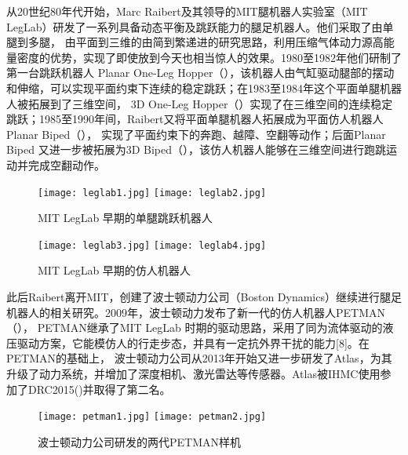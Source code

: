 从20世纪80年代开始，Marc Raibert及其领导的MIT腿机器人实验室（MIT LegLab）研发了一系列具备动态平衡及跳跃能力的腿足机器人。他们采取了由单腿到多腿，
由平面到三维的由简到繁递进的研究思路，利用压缩气体动力源高能量密度的优势，实现了即使放到今天也相当惊人的效果。1980至1982年他们研制了第一台跳跃机器人
Planar One-Leg Hopper（），该机器人由气缸驱动腿部的摆动和伸缩，可以实现平面约束下连续的稳定跳跃；在1983至1984年这个平面单腿机器人被拓展到了三维空间，
3D One-Leg Hopper（）实现了在三维空间的连续稳定跳跃；1985至1990年间，Raibert又将平面单腿机器人拓展成为平面仿人机器人Planar Biped（），
实现了平面约束下的奔跑、越障、空翻等动作；后面Planar Biped 又进一步被拓展为3D Biped（），该仿人机器人能够在三维空间进行跑跳运动并完成空翻动作\cite{raibert1986legged}。
\begin{figure}[htbp]
    \centering
        {%
            \texttt{[image: leglab1.jpg]}}
        {%
            \texttt{[image: leglab2.jpg]}}
    \caption{MIT LegLab 早期的单腿跳跃机器人\label{fig:leglab}}
\end{figure}
\begin{figure}[htbp]
    \centering
        {%
            \texttt{[image: leglab3.jpg]}}
        {%
            \texttt{[image: leglab4.jpg]}}
    \caption{MIT LegLab 早期的仿人机器人\label{fig:leglab_biped}}
\end{figure}
此后Raibert离开MIT，创建了波士顿动力公司（Boston Dynamics）继续进行腿足机器人的相关研究。2009年，波士顿动力发布了新一代的仿人机器人PETMAN（），
PETMAN继承了MIT LegLab 时期的驱动思路，采用了同为流体驱动的液压驱动方案，它能模仿人的行走步态，并具有一定抗外界干扰的能力[8]。在PETMAN的基础上，
波士顿动力公司从2013年开始又进一步研发了Atlas，为其升级了动力系统，并增加了深度相机、激光雷达等传感器。Atlas被IHMC使用参加了DRC2015()并取得了第二名。
\begin{figure}[htbp]
    \centering
        {%
            \texttt{[image: petman1.jpg]}}
        {%
            \texttt{[image: petman2.jpg]}}
    \caption{波士顿动力公司研发的两代PETMAN样机\label{fig:leglab_biped}}
\end{figure}
